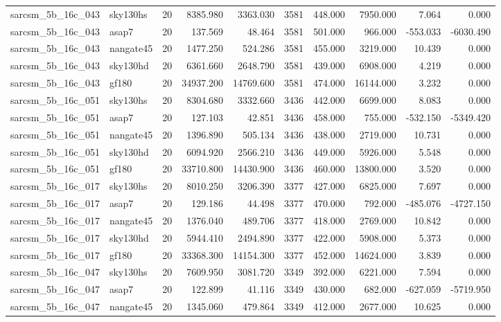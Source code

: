 \begin{longtable}{llrrrrrrrr}
sarcsm\_5b\_16c\_043 & sky130hs & 20 & 8385.980 & 3363.030 & 3581 & 448.000 & 7950.000 & 7.064 & 0.000 \\
sarcsm\_5b\_16c\_043 & asap7 & 20 & 137.569 & 48.464 & 3581 & 501.000 & 966.000 & -553.033 & -6030.490 \\
sarcsm\_5b\_16c\_043 & nangate45 & 20 & 1477.250 & 524.286 & 3581 & 455.000 & 3219.000 & 10.439 & 0.000 \\
sarcsm\_5b\_16c\_043 & sky130hd & 20 & 6361.660 & 2648.790 & 3581 & 439.000 & 6908.000 & 4.219 & 0.000 \\
sarcsm\_5b\_16c\_043 & gf180 & 20 & 34937.200 & 14769.600 & 3581 & 474.000 & 16144.000 & 3.232 & 0.000 \\
sarcsm\_5b\_16c\_051 & sky130hs & 20 & 8304.680 & 3332.660 & 3436 & 442.000 & 6699.000 & 8.083 & 0.000 \\
sarcsm\_5b\_16c\_051 & asap7 & 20 & 127.103 & 42.851 & 3436 & 458.000 & 755.000 & -532.150 & -5349.420 \\
sarcsm\_5b\_16c\_051 & nangate45 & 20 & 1396.890 & 505.134 & 3436 & 438.000 & 2719.000 & 10.731 & 0.000 \\
sarcsm\_5b\_16c\_051 & sky130hd & 20 & 6094.920 & 2566.210 & 3436 & 449.000 & 5926.000 & 5.548 & 0.000 \\
sarcsm\_5b\_16c\_051 & gf180 & 20 & 33710.800 & 14430.900 & 3436 & 460.000 & 13800.000 & 3.520 & 0.000 \\
sarcsm\_5b\_16c\_017 & sky130hs & 20 & 8010.250 & 3206.390 & 3377 & 427.000 & 6825.000 & 7.697 & 0.000 \\
sarcsm\_5b\_16c\_017 & asap7 & 20 & 129.186 & 44.498 & 3377 & 470.000 & 792.000 & -485.076 & -4727.150 \\
sarcsm\_5b\_16c\_017 & nangate45 & 20 & 1376.040 & 489.706 & 3377 & 418.000 & 2769.000 & 10.842 & 0.000 \\
sarcsm\_5b\_16c\_017 & sky130hd & 20 & 5944.410 & 2494.890 & 3377 & 422.000 & 5908.000 & 5.373 & 0.000 \\
sarcsm\_5b\_16c\_017 & gf180 & 20 & 33368.300 & 14154.300 & 3377 & 452.000 & 14624.000 & 3.839 & 0.000 \\
sarcsm\_5b\_16c\_047 & sky130hs & 20 & 7609.950 & 3081.720 & 3349 & 392.000 & 6221.000 & 7.594 & 0.000 \\
sarcsm\_5b\_16c\_047 & asap7 & 20 & 122.899 & 41.116 & 3349 & 430.000 & 682.000 & -627.059 & -5719.950 \\
sarcsm\_5b\_16c\_047 & nangate45 & 20 & 1345.060 & 479.864 & 3349 & 412.000 & 2677.000 & 10.625 & 0.000 \\

\end{longtable}

